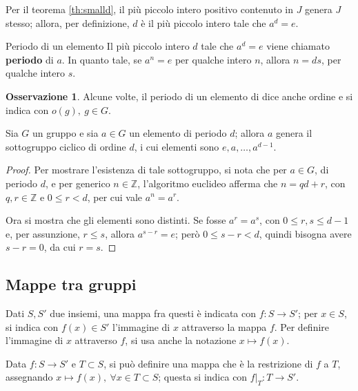 \documentclass[11pt, a4paper]{scrartcl}
\theoremstyle{definition}
\numberwithin{esempio}{section}
\theoremstyle{definition}
\newtheorem{obs}{Osservazione}
\numberwithin{obs}{section}
\numberwithin{nota}{section}
\numberwithin{equation}{subsection}
\begin{document}
Per il teorema \ref{th:smalld}, il pi\`u piccolo intero positivo contenuto in $J$ genera $J$ stesso;
allora, per definizione, $d$ \`e il pi\`u piccolo intero tale che $a^d = e$. 
\begin{definizione}
	{Periodo di un elemento}{}
Il pi\`u piccolo intero $d$ tale che $a^d = e$ viene chiamato \textbf{periodo} di $a$. 
In quanto tale, se $a^n = e$ per qualche intero $n$, allora $n = ds$, per qualche intero $s$.
\end{definizione}
\begin{obs}
Alcune volte, il periodo di un elemento di dice anche ordine e si indica con $o(g), \ g \in G$.
\end{obs}
\begin{teorema}
	{}{}
	Sia $G$ un gruppo e sia $a \in G$ un elemento di periodo $d$; allora $a$ genera il sottogruppo ciclico di ordine $d$, i cui elementi sono $e, a , \ldots, a^{d-1} $.
	\begin{proof}
	Per mostrare l'esistenza di tale sottogruppo, si nota che per $a \in G$, di periodo $d$, e per generico $n \in \mathbb{Z}$, l'algoritmo euclideo afferma che $n = qd +r $, con $q,r \in \mathbb{Z}$ e $0\le r < d$, per cui vale $a^n = a^r$.

	Ora si mostra che gli elementi sono distinti.
	Se fosse $a^r = a^s$, con $0\le r ,s\le d-1$ e, per assunzione, $r\le s$, allora $a^{s-r} = e $; per\`o $0\le  s-r < d$, quindi bisogna avere $s-r=0$, da cui $r=s$.
	\end{proof}
\end{teorema}
\subsection{Mappe tra gruppi}
Dati $S , S' $ due insiemi, una mappa fra questi \`e indicata con $f: S \to S'$; per $x \in S$, si indica con $f(x) \in S'$ l'immagine di $x$ attraverso la mappa $f$.
Per definire l'immagine di $x$ attraverso $f$, si usa anche la notazione $x \mapsto f(x)$.

Data $f:S \to S'$ e $T \subset S$, si pu\`o definire una mappa che \`e la restrizione di $f$ a $T$, assegnando $x \mapsto f(x), \ \forall x \in T \subset S$; questa si indica con $f|_T : T \to S'$.
\end{document}
